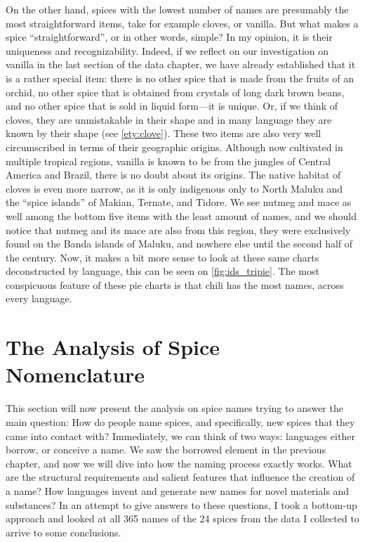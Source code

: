 \noindent On the other hand, spices with the lowest number of names are presumably the most straightforward items, take for example cloves, or vanilla. But what makes a spice ``straightforward'', or in other words, simple? In my opinion, it is their uniqueness and recognizability. Indeed, if we reflect on our investigation on vanilla in the last section of the data chapter, we have already established that it is a rather special item: there is no other spice that is made from the fruits of an orchid, no other spice that is obtained from crystals of long dark brown beans, and no other spice that is sold in liquid form---it is unique. Or, if we think of cloves, they are unmistakable in their shape and in many language they are known by their shape (see \ref{ety:clove}). These two items are also very well circumscribed in terms of their geographic origins. Although now cultivated in multiple tropical regions, vanilla is known to be from the jungles of Central America and Brazil, there is no doubt about its origins. The native habitat of cloves is even more narrow, as it is only indigenous only to North Maluku and the ``spice islands'' of Makian, Ternate, and Tidore. We see nutmeg and mace as well among the bottom five items with the least amount of names, and we should notice that nutmeg and its mace are also from this region, they were exclusively found on the Banda islands of Maluku, and nowhere else until the second half of the  century. Now, it makes a bit more sense to look at these same charts deconstructed by language, this can be seen on \cref{fig:ids_tripie}. The most conspicuous feature of these pie charts is that chili has the most names, across every language.



\section{The Analysis of Spice Nomenclature}
\label{sec:analysis}

This section will now present the analysis on spice names trying to answer the main question: How do people name spices, and specifically, new spices that they came into contact with? Immediately, we can think of two ways: languages either borrow, or conceive a name. We saw the borrowed element in the previous chapter, and now we will dive into how the naming process exactly works. What are the  structural requirements and salient features that influence the creation of a name? How languages invent and generate new names for novel materials and substances? In an attempt to give answers to these questions, I took a bottom-up approach and looked at all 365 names of the 24 spices from the data I collected to arrive to some conclusions. 

